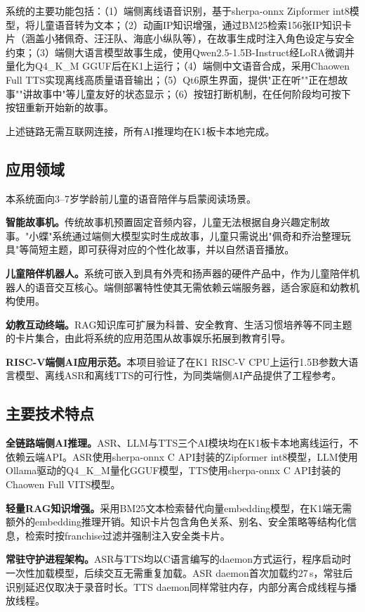 \documentclass[lettersize,journal]{IEEEtran}
\begin{document}
系统的主要功能包括：（1）端侧离线语音识别，基于sherpa-onnx Zipformer int8模型，将儿童语音转为文本；（2）动画IP知识增强，通过BM25检索156张IP知识卡片（涵盖小猪佩奇、汪汪队、海底小纵队等），在故事生成时注入角色设定与安全约束；（3）端侧大语言模型故事生成，使用Qwen2.5-1.5B-Instruct经LoRA微调并量化为Q4\_K\_M GGUF后在K1上运行；（4）端侧中文语音合成，采用Chaowen Full TTS实现离线高质量语音输出；（5）Qt6原生界面，提供"正在听""正在想故事""讲故事中"等儿童友好的状态显示；（6）按钮打断机制，在任何阶段均可按下按钮重新开始新的故事。

上述链路无需互联网连接，所有AI推理均在K1板卡本地完成。

\subsection{应用领域}

本系统面向3--7岁学龄前儿童的语音陪伴与启蒙阅读场景。

\textbf{智能故事机。}传统故事机预置固定音频内容，儿童无法根据自身兴趣定制故事。"小蝶"系统通过端侧大模型实时生成故事，儿童只需说出"佩奇和乔治整理玩具"等简短主题，即可获得对应的个性化故事，并以自然语音播放。

\textbf{儿童陪伴机器人。}系统可嵌入到具有外壳和扬声器的硬件产品中，作为儿童陪伴机器人的语音交互核心。端侧部署特性使其无需依赖云端服务器，适合家庭和幼教机构使用。

\textbf{幼教互动终端。}RAG知识库可扩展为科普、安全教育、生活习惯培养等不同主题的卡片集合，由此将系统的应用范围从故事娱乐拓展到教育引导。

\textbf{RISC-V端侧AI应用示范。}本项目验证了在K1 RISC-V CPU上运行1.5B参数大语言模型、离线ASR和离线TTS的可行性，为同类端侧AI产品提供了工程参考。

\subsection{主要技术特点}

\textbf{全链路端侧AI推理。}ASR、LLM与TTS三个AI模块均在K1板卡本地离线运行，不依赖云端API。ASR使用sherpa-onnx C API封装的Zipformer int8模型，LLM使用Ollama驱动的Q4\_K\_M量化GGUF模型，TTS使用sherpa-onnx C API封装的Chaowen Full VITS模型。

\textbf{轻量RAG知识增强。}采用BM25文本检索替代向量embedding模型，在K1端无需额外的embedding推理开销。知识卡片包含角色关系、别名、安全策略等结构化信息，检索时按franchise过滤并强制注入安全类卡片。

\textbf{常驻守护进程架构。}ASR与TTS均以C语言编写的daemon方式运行，程序启动时一次性加载模型，后续交互无需重复加载。ASR daemon首次加载约27\,s，常驻后识别延迟仅取决于录音时长。TTS daemon同样常驻内存，内部分离合成线程与播放线程。
\end{document}

